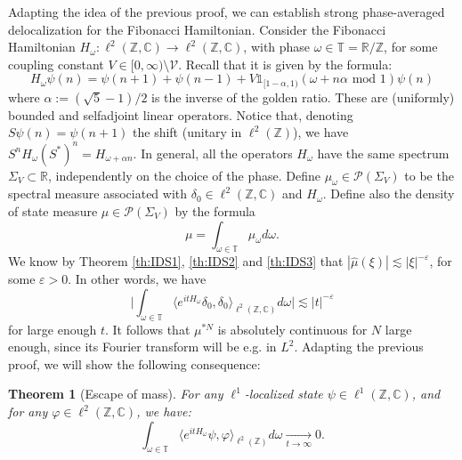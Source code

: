 \documentclass[a4paper]{article}
\newtheorem{theorem}{Theorem}[section]
\theoremstyle{definition}
\begin{document}
Adapting the idea of the previous proof, we can establish strong phase-averaged delocalization for the Fibonacci Hamiltonian.
Consider the Fibonacci Hamiltonian $H_\omega : \ell^2(\mathbb{Z},\mathbb{C}) \rightarrow \ell^2(\mathbb{Z},\mathbb{C})$, with phase $\omega \in \mathbb{T} = \mathbb{R}/\mathbb{Z}$, for some coupling constant $V \in [0,\infty) \setminus \mathcal{V}$. Recall that it is given by the formula:
$$ H_\omega \psi(n) = \psi(n+1)+\psi(n-1)+V \mathbb{1}_{[1-\alpha,1)}(\omega+n \alpha \text{ mod } 1) \psi(n) $$
where $\alpha := (\sqrt{5}-1)/2$ is the inverse of the golden ratio.
These are (uniformly) bounded and selfadjoint linear operators. Notice that, denoting $S \psi(n) = \psi(n+1)$ the shift (unitary in $\ell^2(\mathbb{Z})$), we have $S^n H_\omega (S^*)^n = H_{\omega+\alpha n}$. In general, all the operators $H_\omega$ have the same spectrum $\Sigma_V \subset \mathbb{R}$, independently on the choice of the phase. Define $\mu_\omega \in \mathcal{P}(\Sigma_V)$ to be the spectral measure associated with $\delta_0 \in \ell^2(\mathbb{Z},\mathbb{C})$ and $H_\omega$. Define also the density of state measure $\mu \in \mathcal{P}(\Sigma_V)$ by the formula $$\mu = \int_{\omega \in \mathbb{T}} \mu_\omega d\omega.$$ We know by Theorem \ref{th:IDS1}, \ref{th:IDS2} and \ref{th:IDS3} that $ |\widehat{\mu}(\xi)| \lesssim |\xi|^{-\varepsilon} $,
for some $\varepsilon>0$. In other words, we have
$$ \Big| \int_{\omega \in \mathbb{T}} \langle e^{it H_\omega} \delta_0,\delta_0\rangle_{\ell^2(\mathbb{Z},\mathbb{C})} d\omega \Big| \lesssim |t|^{-\varepsilon}$$
for large enough $t$. It follows that $\mu^{*N} $ is absolutely continuous for $N$ large enough, since its Fourier transform will be e.g. in $L^2$. Adapting the previous proof, we will show the following consequence:
\begin{theorem}[Escape of mass]
For any $\ell^1$-localized state $\psi \in \ell^1(\mathbb{Z},\mathbb{C})$, and for any $\varphi \in \ell^2(\mathbb{Z},\mathbb{C})$, we have:
$$ \int_{\omega \in \mathbb{T}} \langle e^{itH_\omega} \psi, \varphi \rangle_{\ell^2(\mathbb{Z})} d\omega \underset{t \rightarrow \infty}{\longrightarrow} 0 .$$
\end{theorem}
\end{document}
